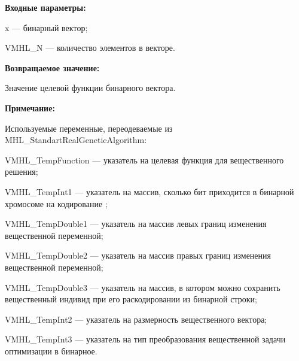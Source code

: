 \textbf{Входные параметры:}
 
x --- бинарный вектор;

 VMHL\_N --- количество элементов в векторе.

\textbf{Возвращаемое значение:} 

Значение целевой функции бинарного вектора.
 
\textbf{Примечание:}

Используемые переменные, переодеваемые из MHL\_StandartRealGeneticAlgorithm:
 
VMHL\_TempFunction --- указатель на целевая функция для вещественного решения;
 
VMHL\_TempInt1 --- указатель на массив, сколько бит приходится в бинарной хромосоме на кодирование ;
 
VMHL\_TempDouble1 --- указатель на массив левых границ изменения вещественной переменной;
 
VMHL\_TempDouble2 --- указатель на массив правых границ изменения вещественной переменной;
 
VMHL\_TempDouble3 --- указатель на массив, в котором можно сохранить вещественный индивид при его раскодировании из бинарной строки;
 
VMHL\_TempInt2 --- указатель на размерность вещественного вектора;
 
VMHL\_TempInt3 --- указатель на тип преобразования вещественной задачи оптимизации в бинарное.
